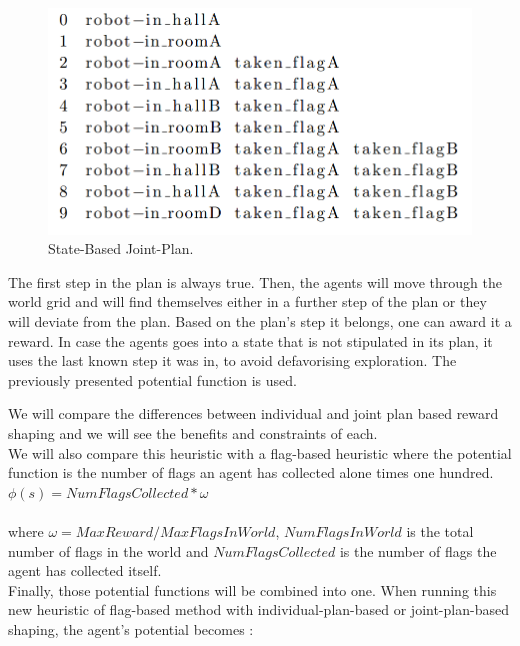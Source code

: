 \documentclass[letterpaper]{article}
\begin{document}
\begin{figure}[h!]
\centering
  \includegraphics[width=1\linewidth]{img/listingFormattedJoinAgent1.png}
  \caption{State-Based Joint-Plan.}
  \label{fig:plan3}
\end{figure}

The first step in the plan is always true. Then, the agents will move through the world grid and will find themselves either in a further step of the plan or they will deviate from the plan. Based on the plan's step it belongs, one can award it a reward. In case the agents goes into a state that is not stipulated in its plan, it uses the last known step it was in, to avoid defavorising exploration. The previously presented potential function is used.

 We will compare the differences between individual and joint plan based reward shaping and we will see the benefits and constraints of each.\\

We will also compare this heuristic with a flag-based heuristic where the potential function is the number of flags an agent has collected alone times one hundred. \\

$\phi (s) =  NumFlagsCollected*\omega$\\\\
where $\omega = MaxReward/MaxFlagsInWorld$, $NumFlagsInWorld$ is the total number of flags in the world and $NumFlagsCollected$ is the number of flags the agent has collected itself.\\

Finally, those potential functions will be combined into one. When running this new heuristic of flag-based method with individual-plan-based or joint-plan-based shaping, the agent's potential becomes :\\
\end{document}

